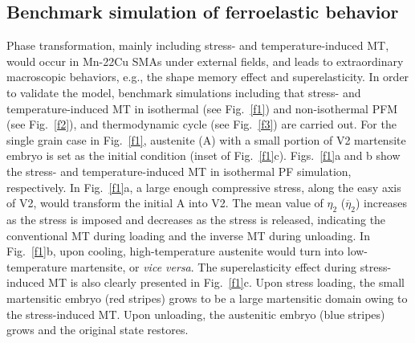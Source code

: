 \documentclass[reprint,3p,sort&compress,times,onecolumn]{elsarticle}
\begin{document}
\subsection{Benchmark simulation of ferroelastic behavior}
Phase transformation, mainly including stress- and temperature-induced MT, would occur in Mn-22Cu SMAs under external fields, and leads to extraordinary macroscopic behaviors, e.g., the shape memory effect and superelasticity. In order to validate the model, benchmark simulations including that stress- and temperature-induced MT in isothermal (see Fig.~\ref{f1}) and non-isothermal PFM (see Fig.~\ref{f2}), and thermodynamic cycle (see Fig.~\ref{f3}) are carried out.   
For the single grain case in Fig.~\ref{f1}, austenite (A) with a small portion of V2 martensite embryo is set as the initial condition (inset of Fig.~\ref{f1}c).
Figs.~\ref{f1}a and b show the stress- and temperature-induced MT in isothermal PF simulation, respectively.
In Fig.~\ref{f1}a, a large enough compressive stress, along the easy axis of V2, would transform the initial A into V2. The mean value of $\eta_2$ ($\overline{\eta}_2$) increases as the stress is imposed and decreases as the stress is released, indicating the conventional MT during loading and the inverse MT during unloading. 
In Fig.~\ref{f1}b, upon cooling, high-temperature austenite would turn into low-temperature martensite, or \textit{vice versa}.
The superelasticity effect during stress-induced MT is also clearly presented in Fig.~\ref{f1}c.
Upon stress loading, the small martensitic embryo (red stripes) grows to be a large martensitic domain owing to the stress-induced MT. Upon unloading, the austenitic embryo (blue stripes) grows and the original state restores.
\end{document}
